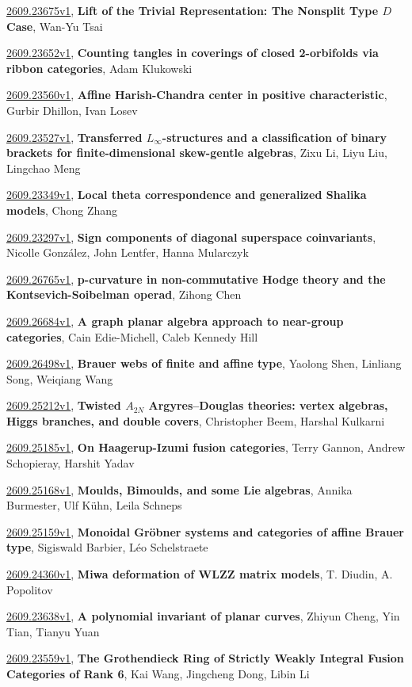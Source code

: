 \documentclass[9pt, a4paper]{article}
\theoremstyle{plain}
\theoremstyle{definition}
\theoremstyle{remark}
\newcommand{\arxiv}[3]{\href{https://arxiv.org/abs/#1}{#1}, \textbf{\textcolor{arxivblue}{#2}}, #3}
\begin{document}
\arxiv{2609.23675v1}{Lift of the Trivial Representation: The Nonsplit Type $D$ Case}{Wan-Yu Tsai}

\arxiv{2609.23652v1}{Counting tangles in coverings of closed 2-orbifolds via ribbon categories}{Adam Klukowski}

\arxiv{2609.23560v1}{Affine Harish-Chandra center in positive characteristic}{Gurbir Dhillon, Ivan Losev}

\arxiv{2609.23527v1}{Transferred $L_\infty$-structures and a classification of binary brackets for finite-dimensional skew-gentle algebras}{Zixu Li, Liyu Liu, Lingchao Meng}

\arxiv{2609.23349v1}{Local theta correspondence and generalized Shalika models}{Chong Zhang}

\arxiv{2609.23297v1}{Sign components of diagonal superspace coinvariants}{Nicolle González, John Lentfer, Hanna Mularczyk}

\arxiv{2609.26765v1}{p-curvature in non-commutative Hodge theory and the Kontsevich-Soibelman operad}{Zihong Chen}

\arxiv{2609.26684v1}{A graph planar algebra approach to near-group categories}{Cain Edie-Michell, Caleb Kennedy Hill}

\arxiv{2609.26498v1}{Brauer webs of finite and affine type}{Yaolong Shen, Linliang Song, Weiqiang Wang}

\arxiv{2609.25212v1}{Twisted \texorpdfstring{$A_{2N}$}{A(2N)} Argyres--Douglas theories: vertex algebras, Higgs branches, and double covers}{Christopher Beem, Harshal Kulkarni}

\arxiv{2609.25185v1}{On Haagerup-Izumi fusion categories}{Terry Gannon, Andrew Schopieray, Harshit Yadav}

\arxiv{2609.25168v1}{Moulds, Bimoulds, and some Lie algebras}{Annika Burmester, Ulf Kühn, Leila Schneps}

\arxiv{2609.25159v1}{Monoidal Gröbner systems and categories of affine Brauer type}{Sigiswald Barbier, Léo Schelstraete}

\arxiv{2609.24360v1}{Miwa deformation of WLZZ matrix models}{T. Diudin, A. Popolitov}

\arxiv{2609.23638v1}{A polynomial invariant of planar curves}{Zhiyun Cheng, Yin Tian, Tianyu Yuan}

\arxiv{2609.23559v1}{The Grothendieck Ring of Strictly Weakly Integral Fusion Categories of Rank 6}{Kai Wang, Jingcheng Dong, Libin Li}

\end{document}

